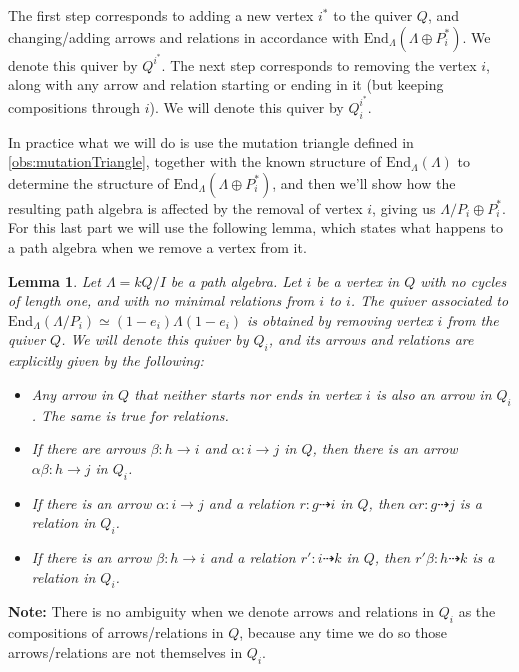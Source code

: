 \documentclass[12pt, dvipsnames, oneside]{amsart}
\newtheorem{lemma}[theorem]{Lemma}
\theoremstyle{definition}
\newcommand{\End}{\text{End}}
\begin{document}
The first step corresponds to adding a new vertex $i^*$ to the quiver $Q$, and changing/adding arrows and relations in accordance with $\End_{\Lambda}(\Lambda\oplus P_i^*)$. We denote this quiver by $Q^{i^*}$. The next step corresponds to removing the vertex $i$, along with any arrow and relation starting or ending in it (but keeping compositions through $i$). We will denote this quiver by $Q_i^{i^*}$.

In practice what we will do is use the mutation triangle defined in \cref{obs:mutationTriangle}, together with the known structure of $\End_\Lambda(\Lambda)$ to determine the structure of $\End_\Lambda(\Lambda\oplus P_i^*)$, and then we'll show how the resulting path algebra is affected by the removal of vertex $i$, giving us $\Lambda/P_i\oplus P_i^*$. For this last part we will use the following lemma, which states what happens to a path algebra when we remove a vertex from it. 

\begin{lemma}\label{lemma:QuiverRemoveVertex}
Let $\Lambda = kQ/I$ be a path algebra. Let $i$ be a vertex in $Q$ with no cycles of length one, and with no minimal relations from $i$ to $i$. The quiver associated to $\mathrm{End}_\Lambda(\Lambda/P_i)\simeq (1-e_i)\Lambda(1-e_i)$ is obtained by removing vertex $i$ from the quiver $Q$. We will denote this quiver by $Q_i$, and its arrows and relations are explicitly given by the following:
\begin{itemize}
\item Any arrow in $Q$ that neither starts nor ends in vertex $i$ is also an arrow in $Q_i$. The same is true for relations.
\item If there are arrows $\beta\colon h\rightarrow i$ and $\alpha\colon i\rightarrow j$ in $Q$, then there is an arrow $\alpha\beta\colon h\rightarrow j$ in $Q_i$.
\item If there is an arrow $\alpha\colon i\rightarrow j$ and a relation $r\colon g\dashrightarrow i$ in $Q$, then $\alpha r\colon g\dashrightarrow j$ is a relation in $Q_i$.
\item If there is an arrow $\beta\colon h\rightarrow i$ and a relation $r'\colon i\dashrightarrow k$ in $Q$, then $r'\beta\colon h\dashrightarrow k$ is a relation in $Q_i$.
\end{itemize}
\end{lemma}

\textbf{Note:} There is no ambiguity when we denote arrows and relations in $Q_i$ as the compositions of arrows/relations in $Q$, because any time we do so those arrows/relations are not themselves in $Q_i$.
\end{document}
